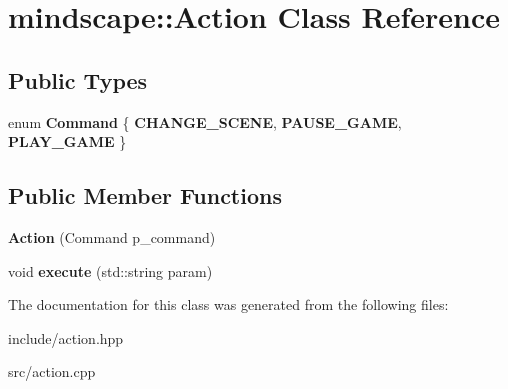 \hypertarget{classmindscape_1_1_action}{}\section{mindscape\+:\+:Action Class Reference}
\label{classmindscape_1_1_action}
\subsection*{Public Types}
\begin{DoxyCompactItemize}
\item 
enum {\bfseries Command} \{ {\bfseries C\+H\+A\+N\+G\+E\+\_\+\+S\+C\+E\+NE}, 
{\bfseries P\+A\+U\+S\+E\+\_\+\+G\+A\+ME}, 
{\bfseries P\+L\+A\+Y\+\_\+\+G\+A\+ME}
 \}\hypertarget{classmindscape_1_1_action_a799877bede87f249b2130a4ec3eefcf4}{}\label{classmindscape_1_1_action_a799877bede87f249b2130a4ec3eefcf4}

\end{DoxyCompactItemize}
\subsection*{Public Member Functions}
\begin{DoxyCompactItemize}
\item 
{\bfseries Action} (Command p\+\_\+command)\hypertarget{classmindscape_1_1_action_a15bc9dff5d0e39a84e0482ed5a018af4}{}\label{classmindscape_1_1_action_a15bc9dff5d0e39a84e0482ed5a018af4}

\item 
void {\bfseries execute} (std\+::string param)\hypertarget{classmindscape_1_1_action_a825be60d061bdd84b879a537132406bc}{}\label{classmindscape_1_1_action_a825be60d061bdd84b879a537132406bc}

\end{DoxyCompactItemize}


The documentation for this class was generated from the following files\+:\begin{DoxyCompactItemize}
\item 
include/action.\+hpp\item 
src/action.\+cpp\end{DoxyCompactItemize}
